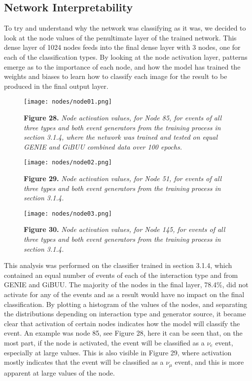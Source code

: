 
\subsection{Network Interpretability}

\noindent To try and understand why the network was classifying as it was, we decided to look at the node values of the penultimate layer of the trained network. This dense layer of 1024 nodes feeds into the final dense layer with 3 nodes, one for each of the classification types. By looking at the node activation layer, patterns emerge as to the importance of each node, and how the model has trained the weights and biases to learn how to classify each image for the result to be produced in the final output layer.\medskip

\begin{figure}[t!]
 \centering
 \texttt{[image: nodes/node01.png]}
 
 \textbf{Figure 28.} \textit{Node activation values, for Node 85, for events of all three types and both event generators from the training process in section 3.1.4, where the network was trained and tested on equal GENIE and GiBUU combined data over 100 epochs.}

 \texttt{[image: nodes/node02.png]}
 
 \textbf{Figure 29.} \textit{Node activation values, for Node 51, for events of all three types and both event generators from the training process in section 3.1.4.}

 \texttt{[image: nodes/node03.png]}
 
 \textbf{Figure 30.} \textit{Node activation values, for Node 145, for events of all three types and both event generators from the training process in section 3.1.4.}
\end{figure}



\noindent This analysis was performed on the classifier trained in section 3.1.4, which contained an equal number of events of each of the interaction type and from GENIE and GiBUU. The majority of the nodes in the final layer, 78.4\%, did not activate for any of the events and as a result would have no impact on the final classification. By plotting a histogram of the values of the nodes, and separating the distributions depending on interaction type and generator source, it became clear that activation of certain nodes indicates how the model will classify the event. An example was node 85, see Figure 28, here it can be seen that, on the most part, if the node is activated, the event will be classified as a $\nu_e$ event, especially at large values. This is also visible in Figure 29, where activation mostly indicates that the event will be classified as a $\nu_\mu$ event, and this is more apparent at large values of the node.\medskip

